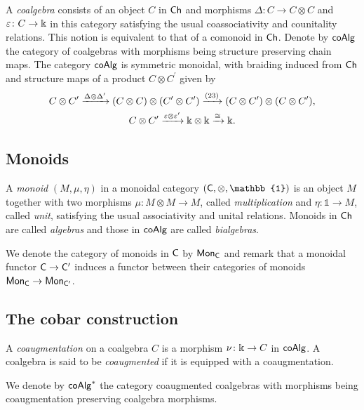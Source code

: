 A \textit{coalgebra} consists of an object $C$ in $\mathsf{Ch}$ and morphisms $\Delta \colon C \to C \otimes C$ and $\varepsilon \colon C \to \Bbbk$ in this category satisfying the usual coassociativity and counitality relations.
This notion is equivalent to that of a comonoid in $\mathsf{Ch}$.
Denote by $\mathsf{coAlg}$ the category of coalgebras with morphisms being structure preserving chain maps.
The category $\mathsf{coAlg}$ is symmetric monoidal, with braiding induced from $\mathsf{Ch}$ and structure maps of a product $C \otimes C^\prime$ given by
\begin{gather*}
C \otimes C^\prime \xrightarrow{\Delta \otimes \Delta^\prime}
(C \otimes C) \otimes (C^\prime \otimes C^\prime) \xrightarrow{(23)}
(C \otimes C^\prime) \otimes (C \otimes C^\prime), \\
C \otimes C^\prime \xrightarrow{\varepsilon \otimes \varepsilon^\prime}
\Bbbk \otimes \Bbbk \xrightarrow{\cong} \Bbbk.
\end{gather*}

\subsection{Monoids}

A \textit{monoid} $(M, \mu, \eta)$ in a monoidal category $(\C, \otimes, \mathbb{1})$ is an object $M$ together with two morphisms $\mu \colon M \otimes M \to M$, called \textit{multiplication} and $\eta \colon \mathbb{1} \to M$, called \textit{unit}, satisfying the usual associativity and unital relations.
Monoids in $\mathsf{Ch}$ are called \textit{algebras} and those in $\mathsf{coAlg}$ are called \textit{bialgebras}.

We denote the category of monoids in $\mathsf{C}$ by $\mathsf{Mon}_{\mathsf{C}}$ and remark that a monoidal functor $\mathsf{C} \to \mathsf{C}^\prime$ induces a functor between their categories of monoids $\mathsf{Mon}_{\mathsf{C}} \to \mathsf{Mon}_{\mathsf{C}^\prime}$.

\subsection{The cobar construction} \label{ss:cobar construction}

A \textit{coaugmentation} on a coalgebra $C$ is a morphism $\nu \colon \Bbbk \to C$ in $\mathsf{coAlg}$.
A coalgebra is said to be \textit{coaugmented} if it is equipped with a coaugmentation.

We denote by $\mathsf{coAlg}^\ast$ the category coaugmented coalgebras with morphisms being coaugmentation preserving coalgebra morphisms.

